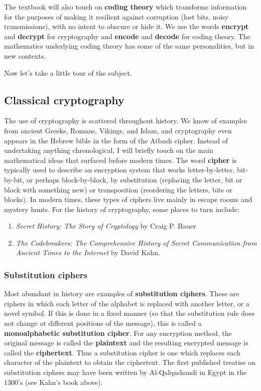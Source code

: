 \documentclass{article}
\theoremstyle{plain}
\theoremstyle{definition}
\theoremstyle{remark}
\numberwithin{theorem}{section}
\begin{document}
The textbook will also touch on \textbf{coding theory} which transforms information for the purposes of making it resilient against corruption (lost bits, noisy transmissions), with no intent to obscure or hide it.  We use the words \textbf{encrypt} and \textbf{decrypt} for cryptography and \textbf{encode} and \textbf{decode} for coding theory.  The mathematics underlying coding theory has some of the same personalities, but in new contexts.

Now let's take a little tour of the subject.


\subsection{Classical cryptography}

The use of cryptography is scattered throughout history.  We know of examples from ancient Greeks, Romans, Vikings, and Islam, and cryptography even appears in the Hebrew bible in the form of the Atbash cipher.  Instead of undertaking anything chronological, I will briefly touch on the main mathematical ideas that surfaced before modern times.  The word \textbf{cipher} is typically used to describe an encryption system that works letter-by-letter, bit-by-bit, or perhaps block-by-block, by substitution (replacing the letter, bit or block with something new) or transposition (reordering the letters, bits or blocks).  In modern times, these types of ciphers live mainly in escape rooms and mystery hunts.  For the history of cryptography, some places to turn include:
\begin{enumerate}
	\item \emph{Secret History:  The Story of Cryptology} by Craig P. Bauer
	\item \emph{The Codebreakers:  The Comprehensive History of Secret Communication from Ancient Times to the Internet} by David Kahn.
\end{enumerate}

\subsubsection{Substitution ciphers}
\label{sec:substitution}

Most abundant in history are examples of \textbf{substitution ciphers}.  These are ciphers in which each letter of the alphabet is replaced with another letter, or a novel symbol.  If this is done in a fixed manner (so that the substitution rule does not change at different positions of the message), this is called a \textbf{monoalphabetic substitution cipher}.  For any encryption method, the original message is called the \textbf{plaintext} and the resulting encrypted message is called the \textbf{ciphertext}.  Thus a substitution cipher is one which replaces each character of the plaintext to obtain the ciphertext.  The first published treatise on substitution ciphers may have been written by Al-Qalqashandi in Egypt in the 1300's (see Kahn's book above).
\end{document}
